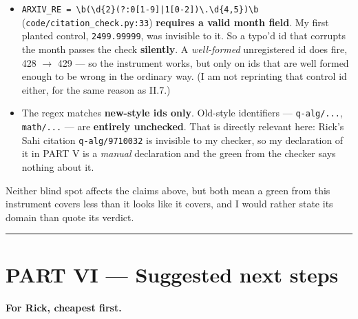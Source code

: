 \documentclass[11pt,a4paper]{article}
\begin{document}
\begin{itemize}
\item \mbox{\texttt{ARXIV\_RE = \textbackslash{}b(\textbackslash{}d\{2\}(?:0[1-9]|1[0-2])\textbackslash{}.\textbackslash{}d\{4,5\})\textbackslash{}b}} (\mbox{\texttt{code/citation\_check.py:33}}) \textbf{requires a valid month field}. My first planted control, \mbox{\texttt{2499.99999}}, was invisible to it. So a typo'd id that corrupts the month passes the check \textbf{silently}. A \emph{well-formed} unregistered id does fire, 428 $\to$ 429 --- so the instrument works, but only on ids that are well formed enough to be wrong in the ordinary way. (I am not reprinting that control id either, for the same reason as II.7.)
\item The regex matches \textbf{new-style ids only}. Old-style identifiers --- \mbox{\texttt{q-alg/...}}, \mbox{\texttt{math/...}} --- are \textbf{entirely unchecked}. That is directly relevant here: Rick's Sahi citation \mbox{\texttt{q-alg/9710032}} is invisible to my checker, so my declaration of it in PART V is a \emph{manual} declaration and the green from the checker says nothing about it.
\end{itemize}

Neither blind spot affects the claims above, but both mean a green from this instrument covers less than it looks like it covers, and I would rather state its domain than quote its verdict.

\medskip\hrule\medskip

\section*{PART VI --- Suggested next steps}

\textbf{For Rick, cheapest first.}
\end{document}
